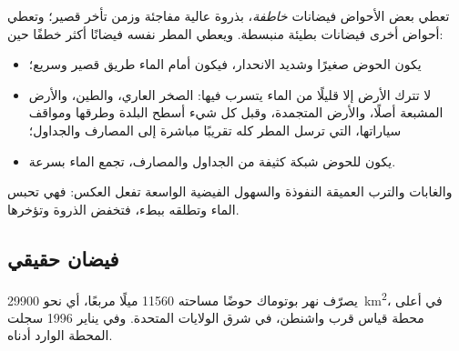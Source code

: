 تعطي بعض الأحواض فيضانات \emph{خاطفة}، بذروة عالية مفاجئة وزمن تأخر
قصير؛ وتعطي أحواض أخرى فيضانات بطيئة منبسطة. ويعطي المطر نفسه فيضانًا أكثر خطفًا
حين:
\begin{itemize}
  \item يكون الحوض صغيرًا وشديد الانحدار، فيكون أمام الماء طريق قصير
        وسريع؛
  \item لا تترك الأرض إلا قليلًا من الماء يتسرب فيها: الصخر العاري، والطين، والأرض
        المشبعة أصلًا، والأرض المتجمدة، وقبل كل شيء أسطح البلدة وطرقها ومواقف
        سياراتها، التي ترسل المطر كله تقريبًا مباشرة إلى المصارف
        والجداول؛
  \item يكون للحوض شبكة كثيفة من الجداول والمصارف، تجمع
        الماء بسرعة.
\end{itemize}
والغابات والترب العميقة النفوذة والسهول الفيضية الواسعة تفعل العكس: فهي تحبس الماء
وتطلقه ببطء، فتخفض الذروة وتؤخرها.

\subsection*{فيضان حقيقي}

يصرّف نهر بوتوماك حوضًا مساحته \num{11560} ميلًا مربعًا، أي نحو
\qty{29900}{km^2}، في أعلى محطة قياس قرب واشنطن، في
شرق الولايات المتحدة. وفي يناير 1996 سجلت المحطة 
الوارد أدناه.

